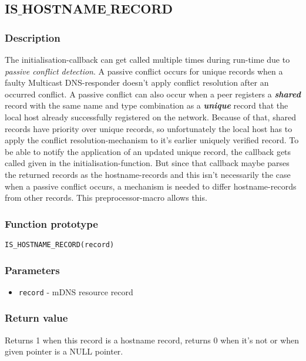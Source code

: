 \subsection{IS$\_$HOSTNAME$\_$RECORD}

\subsubsection*{Description}
The initialisation-callback can get called multiple times during run-time due to \emph{passive conflict detection}. A passive conflict occurs for unique records when a faulty Multicast DNS-responder doesn't apply conflict resolution after an occurred conflict. A passive conflict can also occur when a peer registers a \textbf{\emph{shared}} record with the same name and type combination as a \textbf{\emph{unique}} record that the local host already successfully registered on the network. Because of that, shared records have priority over unique records, so unfortunately the local host has to apply the conflict resolution-mechanism to it's earlier uniquely verified record. To be able to notify the application of an updated unique record, the callback gets called given in the initialisation-function. But since that callback maybe parses the returned records as the hostname-records and this isn't necessarily the case when a passive conflict occurs, a mechanism is needed to differ hostname-records from other records. This preprocessor-macro allows this.

\subsubsection*{Function prototype}
\begin{verbatim}
IS_HOSTNAME_RECORD(record)
\end{verbatim}

\subsubsection*{Parameters}
\begin{itemize}[noitemsep]
\item \texttt{record} - mDNS resource record
\end{itemize}

\subsubsection*{Return value}
Returns 1 when this record is a hostname record, returns 0 when it's not or when given pointer is a NULL pointer.